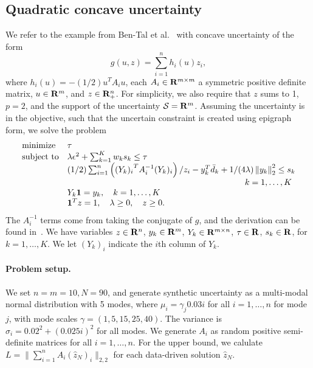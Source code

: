 {\subsection{Quadratic concave uncertainty}
\label{sub:quadraticconcave}
We refer to the example from Ben-Tal et al.~\cite[Section 4.2]{ben-tal_deriving_2015} with concave uncertainty of the form $$g(u,z) = \sum_{i=1}^n h_i(u) z_i,$$ where $h_i(u) = -(1/2)u^TA_iu$, each $A_i\in {\mathbf R}^{m\times m}$ a symmetric positive definite matrix, $u \in {\mathbf R}^m$, and $z \in {\mathbf R}^{n}_{+}$. For simplicity, we also require that $z$ sums to 1, $p = 2$, and the support of the uncertainty $\mathcal{S} = {\mathbf R}^m$. Assuming the uncertainty is in the objective, such that the uncertain constraint is created using epigraph form, we solve the problem
\begin{equation*}
	\begin{array}{ll}
	\text{minimize} & \tau\\
	\text{subject to} & \lambda \epsilon^2 + \sum^{K}_{k=1} w_k s_k \leq \tau\\
	&(1/2)\sum_{i=1}^n \left({(Y_k)_i}^TA_i^{-1}(Y_{k})_i\right)/z_i -y_k^T\bar{d}_k  + 1/(4\lambda) \left\| y_k \right\|^2_2 \leq s_k \\
	&\hspace{7cm} \quad k = 1,\dots,K\\
& Y_{k}\ones = y_k, \quad k = 1,\dots,K\\
	& \ones^T z = 1, \quad \lambda \geq 0,\quad z \geq 0.
	\end{array}
\end{equation*}
The $A_i^{-1}$ terms come from taking the conjugate of $g$, and the derivation can be found in~\cite[Example 24]{ben-tal_deriving_2015}. We have variables $z \in {\mathbf R}^n$, $y_k \in {\mathbf R}^{m}$, $Y_{k} \in {\mathbf R}^{m\times n}$, $\tau \in {\mathbf R}$, $s_k \in {\mathbf R}$, for $k= 1,\dots,K$. We let $(Y_k)_i$ indicate the $i$th column of $Y_k$.

\paragraph{Problem setup.}
We set $n = m = 10, N = 90$, and generate synthetic uncertainty as a multi-modal normal distribution with 5 modes, where $\mu_i = \gamma_j0.03i$ for all $i = 1,\dots, n$ for mode $j$, with mode scales $\gamma = (1, 5,15,25,40)$. The variance is $\sigma_i = 0.02^2 + (0.025i)^2$ for all modes. We generate $A_i$ as random positive semi-definite matrices for all $i = 1,\dots, n$. For the upper bound, we calulate $L = \|\sum_{i=1}^n A_i(\hat{z}_{N})_i\|_{2,2}$ for each data-driven solution $\hat{z}_N$.
\reviewChanges{
}}
